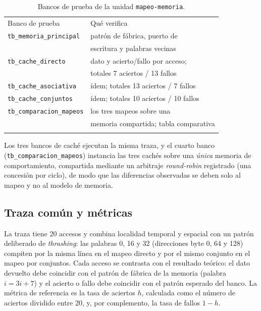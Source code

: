 \documentclass[llncs]{llncs}
\begin{document}
\begin{table}[t]
\centering
\small
\begin{tabular}{@{}ll@{}}
\hline
\noalign{\smallskip}
Banco de prueba & Qué verifica \\
\noalign{\smallskip}\hline\noalign{\smallskip}
\texttt{tb\_memoria\_principal} & patrón de fábrica, puerto de \\
 & escritura y palabras vecinas \\
\texttt{tb\_cache\_directo} & dato y acierto/fallo por acceso; \\
 & totales 7 aciertos / 13 fallos \\
\texttt{tb\_cache\_asociativa} & ídem; totales 13 aciertos / 7 fallos \\
\texttt{tb\_cache\_conjuntos} & ídem; totales 10 aciertos / 10 fallos \\
\texttt{tb\_comparacion\_mapeos} & los tres mapeos sobre una \\
 & memoria compartida; tabla comparativa \\
\noalign{\smallskip}\hline
\end{tabular}
\caption{Bancos de prueba de la unidad \texttt{mapeo-memoria}.}
\label{tab:bancos}
\end{table}

Los tres bancos de caché ejecutan la misma traza, y el cuarto
banco (\texttt{tb\_\allowbreak comparacion\_\allowbreak mapeos})
instancia las tres cachés sobre una
\emph{única} memoria de comportamiento, compartida mediante un
arbitraje \emph{round-robin} registrado (una concesión por ciclo), de
modo que las diferencias observadas se deben solo al mapeo y no al
modelo de memoria.

\subsection{Traza común y métricas}

La traza tiene 20 accesos y combina localidad temporal y espacial con
un patrón deliberado de \emph{thrashing}: las palabras 0, 16 y 32
(direcciones byte 0, 64 y 128) compiten por la misma línea en el mapeo
directo y por el mismo conjunto en el mapeo por conjuntos. Cada acceso
se contrasta con el resultado teórico: el dato devuelto debe coincidir
con el patrón de fábrica de la memoria (palabra $i = 3i+7$) y el
acierto o fallo debe coincidir con el patrón esperado del banco. La
métrica de referencia es la tasa de aciertos $h$, calculada como el
número de aciertos dividido entre 20, y, por complemento, la tasa de
fallos $1-h$.
\end{document}
